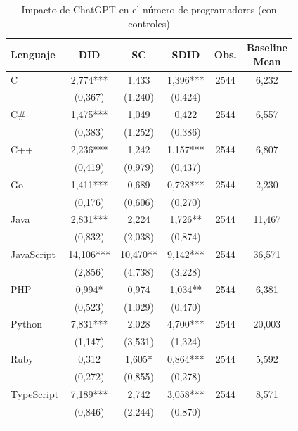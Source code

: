 \begin{table}[htbp]\centering
\caption{Impacto de ChatGPT en el n\'{u}mero de programadores (con controles)}
\label{tab:tabla4}
{\def\sym#1{\ifmmode^{#1}\else\(^{#1}\)\fi}
\begin{tabular}{lccccc}
\toprule
Lenguaje & DID & SC & SDID & Obs. & \shortstack{Baseline \\ Mean} \\
\midrule
C & 2{,}774*** & 1{,}433 & 1{,}396*** & 2544 & 6{,}232 \\
              & (0{,}367) & (1{,}240) & (0{,}424) & & \\
\addlinespace
C\# & 1{,}475*** & 1{,}049 & 0{,}422 & 2544 & 6{,}557 \\
              & (0{,}383) & (1{,}252) & (0{,}386) & & \\
\addlinespace
C++ & 2{,}236*** & 1{,}242 & 1{,}157*** & 2544 & 6{,}807 \\
              & (0{,}419) & (0{,}979) & (0{,}437) & & \\
\addlinespace
Go & 1{,}411*** & 0{,}689 & 0{,}728*** & 2544 & 2{,}230 \\
              & (0{,}176) & (0{,}606) & (0{,}270) & & \\
\addlinespace
Java & 2{,}831*** & 2{,}224 & 1{,}726** & 2544 & 11{,}467 \\
              & (0{,}832) & (2{,}038) & (0{,}874) & & \\
\addlinespace
JavaScript & 14{,}106*** & 10{,}470** & 9{,}142*** & 2544 & 36{,}571 \\
              & (2{,}856) & (4{,}738) & (3{,}228) & & \\
\addlinespace
PHP & 0{,}994* & 0{,}974 & 1{,}034** & 2544 & 6{,}381 \\
              & (0{,}523) & (1{,}029) & (0{,}470) & & \\
\addlinespace
Python & 7{,}831*** & 2{,}028 & 4{,}700*** & 2544 & 20{,}003 \\
              & (1{,}147) & (3{,}531) & (1{,}324) & & \\
\addlinespace
Ruby & 0{,}312 & 1{,}605* & 0{,}864*** & 2544 & 5{,}592 \\
              & (0{,}272) & (0{,}855) & (0{,}278) & & \\
\addlinespace
TypeScript & 7{,}189*** & 2{,}742 & 3{,}058*** & 2544 & 8{,}571 \\
              & (0{,}846) & (2{,}244) & (0{,}870) & & \\
\addlinespace
\bottomrule
\end{tabular}}

\end{table}

